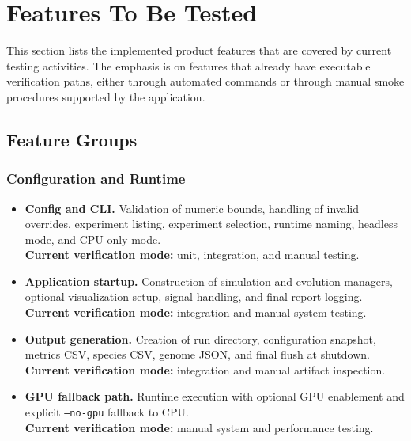 \section{Features To Be Tested}
\label{sec:features}

This section lists the implemented product features that are covered by current testing
activities. The emphasis is on features that already have executable verification paths,
either through automated commands or through manual smoke procedures supported by the
application.

\subsection{Feature Groups}

\subsubsection{Configuration and Runtime}

\begin{itemize}[leftmargin=*]
	\item \textbf{Config and CLI.} Validation of numeric bounds, handling of invalid
	      overrides, experiment listing, experiment selection, runtime naming, headless mode,
	      and CPU-only mode.\\
	      \textbf{Current verification mode:} unit, integration, and manual testing.

	\item \textbf{Application startup.} Construction of simulation and evolution managers,
	      optional visualization setup, signal handling, and final report logging.\\
	      \textbf{Current verification mode:} integration and manual system testing.

	\item \textbf{Output generation.} Creation of run directory, configuration snapshot,
	      metrics CSV, species CSV, genome JSON, and final flush at shutdown.\\
	      \textbf{Current verification mode:} integration and manual artifact inspection.

	\item \textbf{GPU fallback path.} Runtime execution with optional GPU enablement and
	      explicit \texttt{--no-gpu} fallback to CPU.\\
	      \textbf{Current verification mode:} manual system and performance testing.
\end{itemize}

